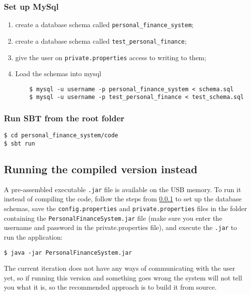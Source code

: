 \subsubsection{Set up MySql} \label{appendix3.setupMySql}
\begin{enumerate}
  \item
    create a database schema called \texttt{personal\_finance\_system};

  \item
    create a database schema called \texttt{test\_personal\_finance};

  \item
    give the user on \texttt{private.properties} access to writing to them;

  \item
    Load the schemas into mysql

    \begin{lstlisting}
    $ mysql -u username -p personal_finance_system < schema.sql
    $ mysql -u username -p test_personal_finance < test_schema.sql
    \end{lstlisting}
\end{enumerate}


\subsubsection{Run SBT from the root folder}
\begin{lstlisting}
$ cd personal_finance_system/code
$ sbt run
\end{lstlisting}


\subsection{Running the compiled version instead} \label{appendix3.runningcompiled}
A pre-assembled executable \texttt{.jar} file is available on the USB memory.
To run it instead of compiling the code, follow the steps from
\ref{appendix3.setupMySql} to set up the database schemas, save the
\texttt{config.properties} and \texttt{private.properties} files in the folder
containing the \texttt{PersonalFinanceSystem.jar} file (make sure you enter the
username and password in the private.properties file), and execute the
\texttt{.jar} to run the application:
\begin{lstlisting}
$ java -jar PersonalFinanceSystem.jar
\end{lstlisting}

The current iteration does not have any ways of communicating with the user
yet, so if running this version and something goes wrong the system will not
tell you what it is, so the recommended approach is to build it from source.

